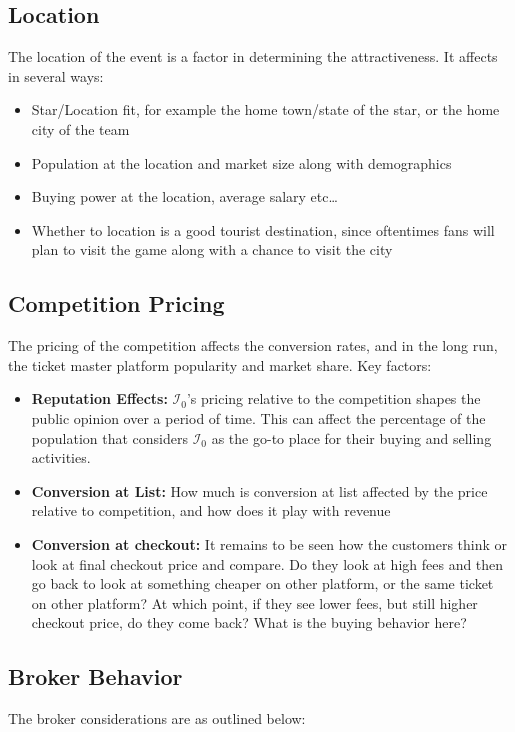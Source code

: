 \documentclass[letterpaper, 12pt]{article}
\begin{document}
\subsection{Location} The location of the event is a factor in determining the attractiveness. It affects in several ways:
\begin{itemize}
	\item Star/Location fit, for example the home town/state of the star, or the home city of the team
	\item Population at the location and market size along with demographics
	\item Buying power at the location, average salary etc\dots
	\item Whether to location is a good tourist destination, since oftentimes fans will plan to visit the game along with a chance to visit the city
\end{itemize}

\subsection{Competition Pricing} The pricing of the competition affects the conversion rates, and in the long run, the ticket master platform popularity and market share. Key factors:
\begin{itemize}
\item {\bf Reputation Effects:} $\mathcal{I}_0$'s pricing relative to the competition shapes the public opinion over a period of time. This can affect the percentage of the population that considers $\mathcal{I}_0$ as the go-to place for their buying and selling activities.
\item {\bf Conversion at List:} How much is conversion at list affected by the price relative to competition, and how does it play with revenue
\item {\bf Conversion at checkout:} It remains to be seen how the customers think or look at final checkout price and compare. Do they look at high fees and then go back to look at something cheaper on other platform, or the same ticket on other platform? At which point, if they see lower fees, but still higher checkout price, do they come back? What is the buying behavior here?
\end{itemize}
\subsection{Broker Behavior}
The broker considerations are as outlined below:
\end{document}
